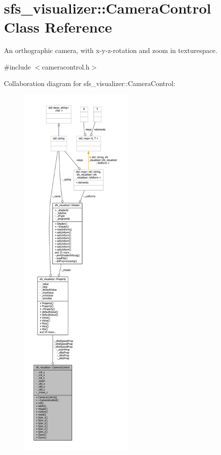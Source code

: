 \section{sfs\-\_\-visualizer\-:\-:Camera\-Control Class Reference}
\label{classsfs__visualizer_1_1CameraControl}


An orthographic camera, with x-\/y-\/z-\/rotation and zoom in texturespace.  




{\ttfamily \#include $<$cameracontrol.\-h$>$}



Collaboration diagram for sfs\-\_\-visualizer\-:\-:Camera\-Control\-:\nopagebreak
\begin{figure}[H]
\begin{center}
\leavevmode
\includegraphics[height=550pt]{d8/d22/classsfs__visualizer_1_1CameraControl__coll__graph}
\end{center}
\end{figure}
